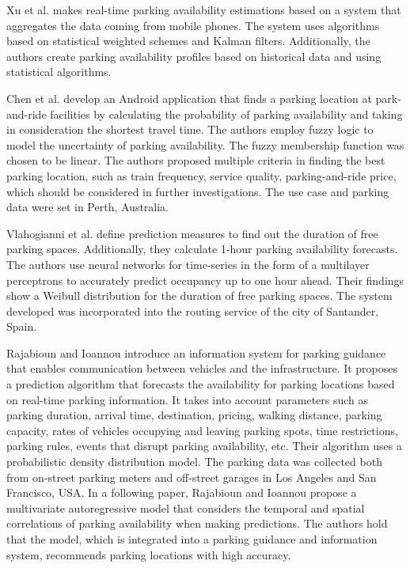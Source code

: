 	
Xu et al. \cite{xu} makes real-time parking availability estimations based on a system that aggregates the data coming from mobile phones. The system uses algorithms based on statistical weighted schemes and Kalman filters. Additionally, the authors create parking availability profiles based on historical data and using statistical algorithms.

Chen et al. \cite{zchen} develop an Android application that finds a parking location at park-and-ride facilities by calculating the probability of parking availability and taking in consideration the shortest travel time. The authors employ fuzzy logic to model the uncertainty of parking availability. The fuzzy membership function was chosen to be linear. The authors proposed multiple criteria in finding the best parking location, such as train frequency, service quality, parking-and-ride price, which should be considered in further investigations. The use case and parking data were set in Perth, Australia.

Vlahogianni et al. \cite{vlahogianni} define prediction measures to find out the duration of free parking spaces. Additionally, they calculate 1-hour parking availability forecasts. The authors use neural networks for time-series in the form of a multilayer perceptrons to accurately predict occupancy up to one hour ahead. Their findings show a Weibull distribution for the duration of free parking spaces. The system developed was incorporated into the routing service of the city of Santander, Spain.

Rajabioun and Ioannou \cite{rajabioun2013} introduce an information system for parking guidance that enables communication between vehicles and the infrastructure. It proposes a prediction algorithm that forecasts the availability for parking locations based on real-time parking information. It takes into account parameters such as parking duration, arrival time, destination, pricing, walking distance, parking capacity, rates of vehicles occupying and leaving parking spots, time restrictions, parking rules, events that disrupt parking availability, etc. Their algorithm uses a probabilistic density distribution model. The parking data was collected both from on-street parking meters and off-street garages in Los Angeles and San Francisco, USA. In a following paper, Rajabioun and Ioannou \cite{rajabioun2015} propose a multivariate autoregressive model that considers the temporal and spatial correlations of parking availability when making predictions.
The authors hold that the model, which is integrated into a parking guidance and information system, recommends parking locations with high accuracy. 

